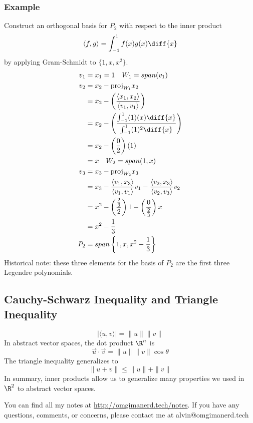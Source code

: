 \documentclass{math}
\begin{document}
\subsubsection*{Example}
Construct an orthogonal basis for \( P_2 \) with respect to the inner product
\[ \langle f,g\rangle = \int_{-1}^{1}f(x)g(x)\diff{x} \]
by applying Gram-Schmidt to \( \{1,x,x^2\} \).
\begin{align*}
  v_1 &= x_1 = 1 \quad W_1 = span(v_1) \\
  v_2 &= x_2-\text{proj}_{W_1}x_2 \\
  &= x_2-\left(\frac{\langle x_1,x_2\rangle}{\langle v_1,v_1\rangle}\right) \\
  &= x_2-\left(
    \frac{\int_{-1}^{1}(1)(x)\diff{x}}{\int_{-1}^{1}(1)^2\diff{x}}\right) \\
  &= x_2-\left(\frac{0}{2}\right)(1) \\
  &= x \quad W_2 = span(1,x) \\
  v_3 &= x_3-\text{proj}_{W_2}x_3 \\
  &= x_3-\frac{\langle v_1,x_3\rangle}{\langle v_1,v_1\rangle} v_1-
    \frac{\langle v_2,x_3\rangle}{\langle v_2,v_3\rangle}v_2 \\
  &= x^2-\left(\frac{\frac{2}{3}}{2}\right)1-
    \left(\frac{0}{\frac{2}{3}}\right)x \\
  &= x^2-\frac{1}{3} \\
  P_2 &= span\left\{1,x,x^2-\frac{1}{3}\right\}
\end{align*}
Historical note: these three elements for the basis of \( P_2 \) are the first
three Legendre polynomials.

\subsection*{Cauchy-Schwarz Inequality and Triangle Inequality}
\[ |\langle u,v\rangle| = \|u\|\|v\| \]
In abstract vector spaces, the dot product \( \R^n \) is
\[ \vec{u}\cdot\vec{v} = \|u\|\|v\|\cos\theta \]
The triangle inequality generalizes to
\[ \|u+v\| \le \|u\|+\|v\| \]
In summary, inner products allow us to generalize many properties we used in
\( \R^2 \) to abstract vector spaces.

\begin{center}
  You can find all my notes at \url{http://omgimanerd.tech/notes}. If you have
  any questions, comments, or concerns, please contact me at
  alvin@omgimanerd.tech
\end{center}
\end{document}
